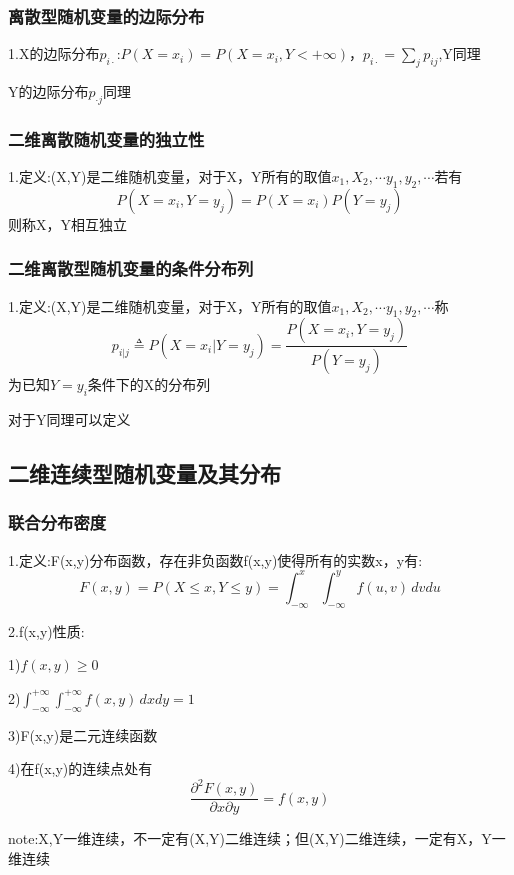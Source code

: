 \documentclass[11pt,twoside,a4paper]{ctexart}
\begin{document}
    \subsubsection{离散型随机变量的边际分布}
    1.X的边际分布$p_{i\cdot}$:$P(X = x_i) = P(X = x_i,Y < +\infty)，p_{i\cdot} = \sum _j  p_{ij}$,Y同理

    Y的边际分布$p_{\cdot j}$同理

    \subsubsection{二维离散随机变量的独立性}
    1.定义:(X,Y)是二维随机变量，对于X，Y所有的取值$x_1,X_2,\cdots y_1,y_2,\cdots$若有
    \[P(X = x_i,Y = y_j) = P(X = x_i)P(Y = y_j)\]
    则称X，Y相互独立

    \subsubsection{二维离散型随机变量的条件分布列}
    1.定义:(X,Y)是二维随机变量，对于X，Y所有的取值$x_1,X_2,\cdots y_1,y_2,\cdots$称
    \[p_{i|j} \triangleq P(X = x_i|Y = y_j) = \frac{P(X = x_i,Y = y_j)}{P(Y = y_j)}\]
    为已知${Y = y_i}$条件下的X的分布列
    
    对于Y同理可以定义

    \subsection{二维连续型随机变量及其分布}
    \subsubsection{联合分布密度}
    1.定义:F(x,y)分布函数，存在非负函数f(x,y)使得所有的实数x，y有:
    \[F(x,y) = P(X\leq x,Y\leq y) = \int_{-\infty}^x\int_{-\infty}^yf(u,v)\,dvdu\]
    
    2.f(x,y)性质:
    \begin{minipage}[t]{0.9\linewidth}
        1)$f(x,y)\geq 0$

        2)$\int_{-\infty}^{+\infty}\int_{-\infty}^{+\infty}f(x,y)\,dxdy = 1$

        3)F(x,y)是二元连续函数

        4)在f(x,y)的连续点处有
        \[\frac{\partial ^2F(x,y)}{\partial x \partial y} = f(x,y)\]

    \end{minipage}

        note:X,Y一维连续，不一定有(X,Y)二维连续；但(X,Y)二维连续，一定有X，Y一维连续
\end{document}
